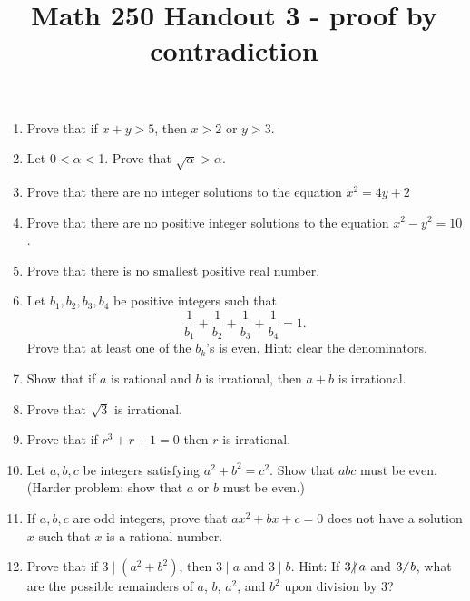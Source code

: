 \documentclass[12pt, reqno]{amsart}
\newcommand{\ndiv}{\hspace{-4pt}\not|\hspace{2pt}}
\begin{document}
\title[Math 250 Handout 3 - proof by contradiction]{Math 250 Handout 3 - proof by contradiction}\maketitle

\begin{enumerate}

\item Prove that if $x + y > 5$, then $x > 2$ or $y > 3$.

\item Let $0 < \alpha <$1. Prove that $\sqrt{\alpha} > \alpha$.

\item Prove that there are no integer solutions to the equation $x^2 = 4y + 2$

\item Prove that there are no positive integer solutions to the equation $x^2 - y^2 = 10$.

\item Prove that there is no smallest positive real number.

\item Let $b_1, b_2, b_3,b_4$ be positive integers such that
 $$\frac{1}{b_1} + \frac{1}{b_2} + \frac{1}{b_3} + \frac{1}{b_4} = 1.$$ 
Prove that at least one of the $b_k$'s is even. Hint: clear the denominators.



\item Show that if $a$ is rational and $b$ is irrational, then $a + b$ is irrational.



\item Prove that $\sqrt{3}$ is irrational.

\item Prove that if $r^3 + r + 1 = 0$ then $r$ is irrational.

\item Let $a, b, c$ be integers satisfying $a^2 + b^2 = c^2$. Show that $abc$ must be even. (Harder problem: show that $a$ or $b$ must be even.)

\item If $a, b, c$ are odd integers, prove that $ax^2 + bx + c = 0$ does not have a solution $x$ such that $x$ is a rational number.

  
 \item Prove that if $3 \mid (a^2 + b^2)$, then $3 \mid a$ and $3 \mid b$. Hint: If $3 \ndiv a$ and $3 \ndiv b$, what are the possible remainders of $a$, $b$, $a^2$, and $b^2$ upon division by 3?


\end{enumerate}
\end{document}
